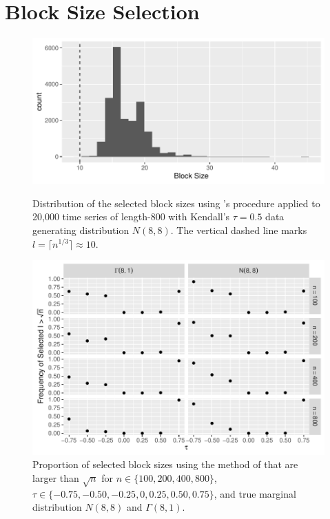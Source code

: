 \documentclass[12pt]{article}
\begin{document}
\section{Block Size Selection}


\begin{figure}[tbp]
  \centering
  \includegraphics[scale=1]{figures/block_dist}
  \caption{Distribution of the selected block sizes using
    \citet{politis2004automatic}'s procedure applied to 20,000
    time series of length-800 with
    Kendall's $\tau = 0.5$ data generating distribution $N(8,8)$. The vertical
    dashed line marks $l = \lceil n^{1/3} \rceil \approx 10$.
  }
  \label{fig:block_dist}


  \centering
  \includegraphics[scale=1]{figures/large_block}
  \caption{Proportion of selected block sizes using the method of
  \citet{politis2004automatic} that are larger than
    $\sqrt{n}$ for $n \in \{100, 200, 400, 800\}$,
    $\tau \in \{-0.75, -0.50, -0.25, 0, 0.25, 0.50, 0.75\}$, and true
    marginal distribution $N(8,8)$ and $\Gamma(8,1)$.
  }
  \label{fig:large_block}
\end{figure}
\end{document}
